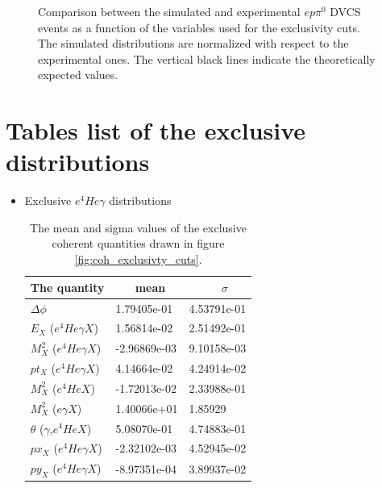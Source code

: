 \begin{figure}[h!]
\caption{Comparison between the simulated and experimental $ep\pi^{0}$ DVCS events as a function of the variables used for the exclusivity cuts. The simulated distributions are normalized with respect to the experimental ones. The vertical black lines indicate the theoretically expected values.} 
\label{fig:incoh_comparison_with_simulation_exclusive}
\end{figure}


\chapter{Tables list of the exclusive distributions}\label{exclusivity_cuts}
\begin{itemize}

\item Exclusive $e^{4}He\gamma$ distributions
\begin {table}[!h]
\begin{center}
\begin{tabular}{|l|l|l|}
\hline
The quantity &  ~~~mean & ~~~~~$\sigma$ \\
\hline
$\Delta \phi$ &  1.79405e-01 & 4.53791e-01 \\
\hline
$E_{X}$ ($e^{4}He\gamma X$) &  1.56814e-02 & 2.51492e-01 \\ 
\hline
$M^{2}_{X}$ ($e^{4}He\gamma X$) &  -2.96869e-03 & 9.10158e-03 \\ 
\hline
$pt_{X}$ ($e^{4}He\gamma X$) & 4.14664e-02 & 4.24914e-02 \\ 
\hline
$M^{2}_{X}$ ($e^{4}HeX$) &  -1.72013e-02 & 2.33988e-01 \\
\hline
 $M^{2}_{X}$ ($e\gamma X$) &  1.40066e+01 & 1.85929 \\
\hline
$\theta$ ($\gamma$,$e^{4}HeX$) &  5.08070e-01 & 4.74883e-01\\
\hline
$px_{X}$ ($e^{4}He\gamma X$) & -2.32102e-03  & 4.52945e-02\\
\hline
$py_{X}$ ($e^{4}He\gamma X$) &  -8.97351e-04 & 3.89937e-02\\ 
\hline
\end{tabular}
\caption{ The mean and sigma values of the exclusive coherent quantities drawn in figure \ref{fig:coh_exclusivty_cuts}.}
\label{Table:coh_exclusivity_cuts}
\end{center}
\end{table}



\end{itemize}
